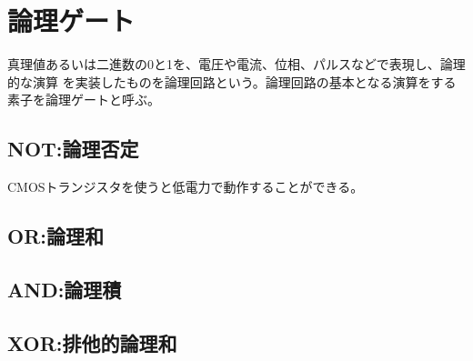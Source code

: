 
\section{論理ゲート}
    真理値あるいは二進数の0と1を、電圧や電流、位相、パルスなどで表現し、論理的な演算
    を実装したものを論理回路という。論理回路の基本となる演算をする素子を論理ゲートと呼ぶ。
    \subsection{NOT:論理否定}
        CMOSトランジスタを使うと低電力で動作することができる。
    \subsection{OR:論理和}
    \subsection{AND:論理積}
    \subsection{XOR:排他的論理和}